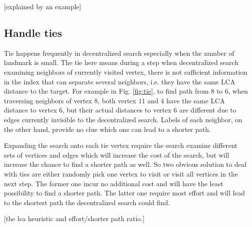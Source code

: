 [explained by an example]

\subsection{Handle ties}

Tie happens frequently in decentralized search especially when the number of landmark is small. The tie here means during a step when decentralized search examining neighbors of currently visited vertex, there is not sufficient information in the index that can separate several neighbors, i.e. they have the same LCA distance to the target. For example in Fig. \ref{fig:tie}, to find path from $8$ to $6$, when traversing neighbors of vertex $8$, both vertex $11$ and $4$ have the same LCA distance to vertex $6$, but their actual distances to vertex $6$ are different due to edges currently invisible to the decentralized search. Labels of each neighbor, on the other hand, provide no clue which one can lead to a shorter path.

Expanding the search onto each tie vertex require the search examine different sets of vertices and edges which will increase the cost of the search, but will increase the chance to find a shorter path as well. So two obvious solution to deal with ties are either randomly pick one vertex to visit or visit all vertices in the next step. The former one incur no additional cost and will have the least possibility to find a shorter path. The latter one require most effort and will lead to the shortest path the decentralized search could find.

[the lca heuristic and effort/shorter path ratio.]
